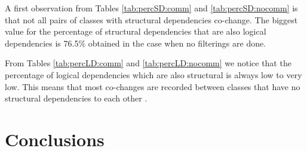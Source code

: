\documentclass[12pt]{mitthesis}
\begin{document}
A first observation from Tables \ref{tab:percSD:comm} and \ref{tab:percSD:nocomm} is that not all pairs of classes with structural dependencies co-change. The biggest value for the percentage of structural dependencies that are also logical dependencies is 76.5\% obtained in the case when no filterings are done.

From Tables \ref{tab:percLD:comm} and \ref{tab:percLD:nocomm} we notice that the percentage of logical dependencies which are also structural is always low to very low. This means that most co-changes are recorded between classes that have no structural dependencies to each other \cite{enase19}.   
 

\chapter{Conclusions}
\label{conclusions}





\end{document}
